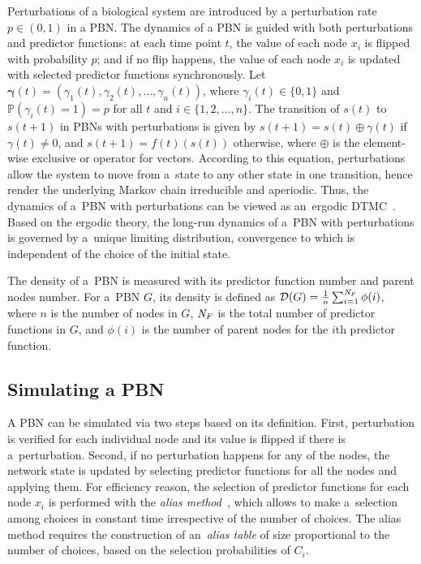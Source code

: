 \documentclass[runningheads,a4paper]{llncs}
\begin{document}
Perturbations of a biological system are introduced by a perturbation rate $p \in (0,1)$ in a PBN.
The dynamics of a PBN is guided with both perturbations and predictor functions:
at each time point $t$, the value of each node $x_i$ is flipped with probability $p$;
and if no flip happens, the value of each node $x_i$ is updated with selected predictor functions synchronously.
Let $\boldsymbol{\gamma}(t)=(\gamma_{1}(t),\gamma_{2}(t),\dots,\gamma_{n}(t))$, where $\gamma_{i}(t)
\in \{0,1\}$ and $\mathbb{P}(\gamma_{i}(t)=1)=p$ for all $t$ and $i \in \{1,2,\dots,n\}$.
The transition of $s(t)$ to $s(t+1)$ in PBNs with perturbations is given by
$s(t+1)=s(t) \oplus \gamma(t)$ if $\gamma(t) \neq0$,
and $s(t+1)=f(t)(s(t))$ otherwise,
%
where $\oplus$ is the element-wise exclusive or operator for vectors.
%
According to this equation,
perturbations allow the system to move from a~state to any other
state in one transition, hence render the underlying Markov chain irreducible and aperiodic.
Thus, the dynamics of a~PBN with perturbations can be viewed as an~ergodic
DTMC~\cite{SD10}.
Based on the ergodic theory,
the long-run dynamics of a~PBN with perturbations
is governed by a~unique limiting distribution,
convergence to which is independent of the choice of the initial state.

The density of a~PBN is measured with its predictor function number and parent nodes number. For
a~PBN $G$, its density is defined as $\mathcal{D}(G)=\frac{1}{n}\sum_{i=1}^{\it N_F}\phi(i)$,
where $n$ is the number of nodes in $G$, ${\it N_F}$ is the total number of predictor functions in
$G$, and $\phi(i)$ is the number of parent nodes for the $i$th predictor function.

\subsection{Simulating a PBN}
\label{ssec:sim}
A PBN can be simulated via two steps based on its definition. First, perturbation is verified for
each individual node and its value is flipped if there is a~perturbation. Second, if no
perturbation happens for any of the nodes, the network state is updated by selecting predictor
functions for all the nodes and applying them. For efficiency reason, the selection of predictor
functions for each node $x_i$ is performed with the \emph{alias method}~\cite{WAJ77}, which allows
to make a~selection among choices in constant time irrespective of the number of choices. The
alias method requires the construction of an~\textit{alias table} of size proportional to the
number of choices, based on the selection probabilities of $C_i$.
\end{document}
